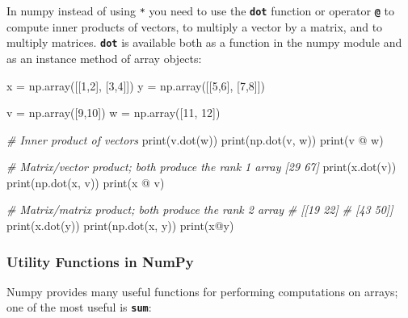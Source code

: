 \documentclass[
]{article}
\newenvironment{Shaded}{}{}
\newcommand{\BuiltInTok}[1]{#1}
\newcommand{\CommentTok}[1]{\textcolor[rgb]{0.38,0.63,0.69}{\textit{#1}}}
\newcommand{\DecValTok}[1]{\textcolor[rgb]{0.25,0.63,0.44}{#1}}
\newcommand{\NormalTok}[1]{#1}
\newcommand{\OperatorTok}[1]{\textcolor[rgb]{0.40,0.40,0.40}{#1}}
\begin{document}
In numpy instead of using \texttt{*} you need to use the
\textbf{\texttt{dot}} function or operator \textbf{\texttt{@}} to
compute inner products of vectors, to multiply a vector by a matrix, and
to multiply matrices. \textbf{\texttt{dot}} is available both as a
function in the numpy module and as an instance method of array objects:

\begin{Shaded}
\begin{Highlighting}[]
\NormalTok{x }\OperatorTok{=}\NormalTok{ np.array([[}\DecValTok{1}\NormalTok{,}\DecValTok{2}\NormalTok{],}
\NormalTok{              [}\DecValTok{3}\NormalTok{,}\DecValTok{4}\NormalTok{]])}
\NormalTok{y }\OperatorTok{=}\NormalTok{ np.array([[}\DecValTok{5}\NormalTok{,}\DecValTok{6}\NormalTok{],}
\NormalTok{              [}\DecValTok{7}\NormalTok{,}\DecValTok{8}\NormalTok{]])}

\NormalTok{v }\OperatorTok{=}\NormalTok{ np.array([}\DecValTok{9}\NormalTok{,}\DecValTok{10}\NormalTok{])}
\NormalTok{w }\OperatorTok{=}\NormalTok{ np.array([}\DecValTok{11}\NormalTok{, }\DecValTok{12}\NormalTok{])}

\CommentTok{\# Inner product of vectors}
\BuiltInTok{print}\NormalTok{(v.dot(w))}
\BuiltInTok{print}\NormalTok{(np.dot(v, w))}
\BuiltInTok{print}\NormalTok{(v }\OperatorTok{@}\NormalTok{ w)}

\CommentTok{\# Matrix/vector product; both produce the rank 1 array [29 67]}
\BuiltInTok{print}\NormalTok{(x.dot(v))}
\BuiltInTok{print}\NormalTok{(np.dot(x, v))}
\BuiltInTok{print}\NormalTok{(x }\OperatorTok{@}\NormalTok{ v)}

\CommentTok{\# Matrix/matrix product; both produce the rank 2 array}
\CommentTok{\# [[19 22]}
\CommentTok{\#  [43 50]]}
\BuiltInTok{print}\NormalTok{(x.dot(y))}
\BuiltInTok{print}\NormalTok{(np.dot(x, y))}
\BuiltInTok{print}\NormalTok{(x}\OperatorTok{@}\NormalTok{y)}
\end{Highlighting}
\end{Shaded}

\hypertarget{utility-functions-in-numpy}{%
\subsubsection{Utility Functions in
NumPy}\label{utility-functions-in-numpy}}

Numpy provides many useful functions for performing computations on
arrays; one of the most useful is \textbf{\texttt{sum}}:
\end{document}
